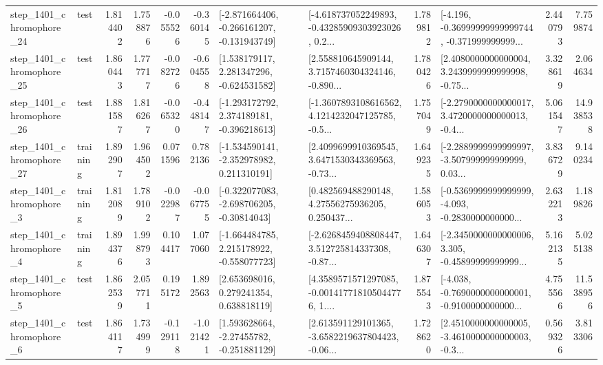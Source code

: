 \begin{tabular}{llrrrrllrlrr}
 step\_1401\_chromophore\_24 &      test &      1.814402 &    1.758876 &     -0.055526 & -0.360145 &  [-2.871664406, -0.266161207, -0.131943749] &  [-4.618737052249893, -0.43285909303923026, 0.2... &       1.789812 &  [-4.196, -0.36999999999999744, -0.371999999999... &            2.440793 &          7.759874 \\
 step\_1401\_chromophore\_25 &      test &      1.860443 &    1.777717 &     -0.082726 & -0.604558 &    [1.538179117, 2.281347296, -0.624531582] &  [2.558810645909144, 3.7157460304324146, -0.890... &       1.780426 &  [2.4080000000000004, 3.2439999999999998, -0.75... &            3.328619 &          2.064634 \\
 step\_1401\_chromophore\_26 &      test &      1.881587 &    1.816267 &     -0.065320 & -0.448147 &   [-1.293172792, 2.374189181, -0.396218613] &  [-1.3607893108616562, 4.1214232047125785, -0.5... &       1.757049 &  [-2.2790000000000017, 3.4720000000000013, -0.4... &            5.061547 &         14.938538 \\
 step\_1401\_chromophore\_27 &  training &      1.892907 &    1.964502 &      0.071596 &  0.782136 &   [-1.534590141, -2.352978982, 0.211310191] &  [2.4099699910369545, 3.6471530343369563, -0.73... &       1.649235 &  [-2.2889999999999997, -3.507999999999999, 0.03... &            3.836729 &          9.140234 \\
  step\_1401\_chromophore\_3 &  training &      1.812089 &    1.789102 &     -0.022987 & -0.067755 &   [-0.322077083, -2.698706205, -0.30814043] &  [0.482569488290148, 4.27556275936205, 0.250437... &       1.586053 &  [-0.5369999999999999, -4.093, -0.2830000000000... &            2.632213 &          1.189826 \\
  step\_1401\_chromophore\_4 &  training &      1.894376 &    1.998793 &      0.104417 &  1.077060 &   [-1.664484785, 2.215178922, -0.558077723] &  [-2.6268459408808447, 3.512725814337308, -0.87... &       1.646307 &  [-2.3450000000000006, 3.305, -0.45899999999999... &            5.162135 &          5.025138 \\
  step\_1401\_chromophore\_5 &      test &      1.862539 &    2.057711 &      0.195172 &  1.892563 &     [2.653698016, 0.279241354, 0.638818119] &  [4.3589571571297085, -0.001417718105044776, 1.... &       1.875543 &  [-4.038, -0.7690000000000001, -0.9100000000000... &            4.755566 &         11.538956 \\
  step\_1401\_chromophore\_6 &      test &      1.864117 &    1.734999 &     -0.129118 & -1.021421 &    [1.593628664, -2.27455782, -0.251881129] &  [2.613591129101365, -3.6582219637804423, -0.06... &       1.728620 &  [2.4510000000000005, -3.4610000000000003, -0.3... &            0.569326 &          3.813306 \\

\end{tabular}

